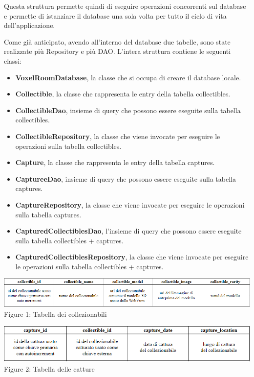 \documentclass{article}
\begin{document}
Questa struttura permette quindi di eseguire operazioni concorrenti sul database e permette di istanziare il database una sola volta per tutto il ciclo
di vita dell'applicazione. 

Come già anticipato, avendo all'interno del database due tabelle, sono state realizzate più Repository e più DAO. L'intera struttura contiene le seguenti
classi:
\begin{itemize}
    \itemsep 0em 
    \item \textbf{VoxelRoomDatabase}, la classe che si occupa di creare il database locale. 
    \item \textbf{Collectible}, la classe che rappresenta le entry della tabella collectibles.
    \item \textbf{CollectibleDao}, insieme di query che possono essere eseguite sulla tabella collectibles.
    \item \textbf{CollectibleRepository}, la classe che viene invocate per eseguire le operazioni sulla tabella collectibles. 
    
    \item \textbf{Capture}, la classe che rappresenta le entry della tabella captures.
    \item \textbf{CaptureeDao}, insieme di query che possono essere eseguite sulla tabella captures.
    \item \textbf{CaptureRepository}, la classe che viene invocate per eseguire le operazioni sulla tabella captures. 
    
    \item \textbf{CapturedCollectiblesDao}, l'insieme di query che possono essere eseguite sulla tabella collectibles + captures.
    \item \textbf{CapturedCollectiblesRepository}, la classe che viene invocate per eseguire le operazioni sulla tabella collectibles + captures. 
\end{itemize}

\medskip

\begin{center}
    \includegraphics[width=\textwidth]{collectibles}   
    Figure 1: Tabella dei collezionabili
\end{center}

\medskip

\begin{center}
    \includegraphics[width=\textwidth]{captures}   
    Figure 2: Tabella delle catture
\end{center}
\end{document}

